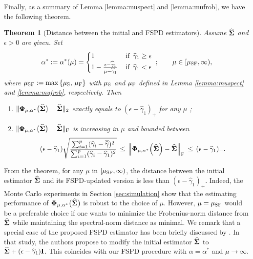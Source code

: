 \documentclass[times,sort&compress,3p]{elsarticle}
\newcommand{\BNUM}{\begin{enumerate}}
\newcommand{\ENUM}{\end{enumerate}}
\newcommand{\NN}{\nonumber}
\newtheorem{theorem}{Theorem}
\begin{document}
Finally, as a summary of Lemma \ref{lemma:muspect} and \ref{lemma:mufrob}, we have the following theorem.

\begin{theorem}[Distance between the initial and FSPD estimators]\label{thm:FSPDsumm}
Assume $\widehat{\bf \Sigma}$ and $\epsilon > 0$ are given. Set
\begin{equation}\NN
\alpha^* := \alpha^*(\mu) =
\begin{cases} 1  & \,\mbox{if }\, \widehat{\gamma}_{1} \geq \epsilon \\
	1 - \frac{\epsilon - \widehat{\gamma}_{1}}{\mu - \widehat{\gamma}_{1}} & \,\mbox{if }\,
	\widehat{\gamma}_{1} < \epsilon \end{cases} ~; \qquad
	\mu \in [\mu_{\rm SF}, \infty),
\end{equation}
where $\mu_{\rm SF} := \max \left\{ \mu_{\rm S}, \, \mu_{\rm F} \right\}$ with $\mu_{\rm S}$ and $\mu_{\rm F}$ defined in Lemma \ref{lemma:muspect} and \ref{lemma:mufrob}, respectively. Then
\BNUM
\item $\| {\bf \Phi}_{\mu, \alpha^*}\big(\widehat{\bf \Sigma}\big)
	- \widehat{\bf \Sigma} \|_2$ exactly equals to
	$(\epsilon - \widehat{\gamma}_{1})_+$
	for any $\mu$ ;
\item $\| {\bf \Phi}_{\mu, \alpha^*}\big(\widehat{\bf \Sigma}\big)
	- \widehat{\bf \Sigma} \|_{\rm F}$ is increasing
	 in $\mu$ and bounded between
\[
(\epsilon - \widehat{\gamma}_{1}) 
 \sqrt{\frac{\sum_{i=1}^p ({\widehat{\gamma}}_i - {\overline{\widehat{\gamma}}})^2}{\sum_{i=1}^p ({\widehat{\gamma}}_i - {\widehat{\gamma}}_1)^2} } 
\,\leq\,
\left\| {\bf \Phi}_{\mu, \alpha^*}\Big(\widehat{\bf \Sigma}\Big) 
	- \widehat{\bf \Sigma} \right\|_{\rm F}
\,\leq\, (\epsilon - \widehat{\gamma}_{1})_+.
\]
\ENUM
\end{theorem}
From the theorem, for any $\mu$ in $\left[ \mu_{\rm SF}, \infty \right)$,
the distance between the initial estimator $\widehat{\bf \Sigma}$ and its FSPD-updated version
is less than $(\epsilon - \widehat{\gamma}_{1})_+$.
Indeed, the Monte Carlo experiments in Section \ref{sec:simulation} show that the estimating performance of
${\bf \Phi}_{\mu, \alpha^*}\big(\widehat{\bf \Sigma}\big)$ is robust to
the choice of $\mu$. However, $\mu = \mu_{\rm SF}$ would be a preferable choice
if one wants to minimize the Frobenius-norm distance from $\widehat{\bf \Sigma}$ while maintaining the
spectral-norm distance as minimal.
We remark that a special case of the proposed FSPD estimator has been briefly discussed
by  \citet[Section 5.2]{Cai2014b}.
In that study, the authors
propose to modify the initial estimator $\widehat{\bf \Sigma}$ to
$\widehat{\bf \Sigma} + (\epsilon - \widehat{\gamma}_{1}) {\bf I}$. This coincides with
our FSPD procedure with $\alpha = \alpha^*$ and $\mu \rightarrow \infty$.
\end{document}
